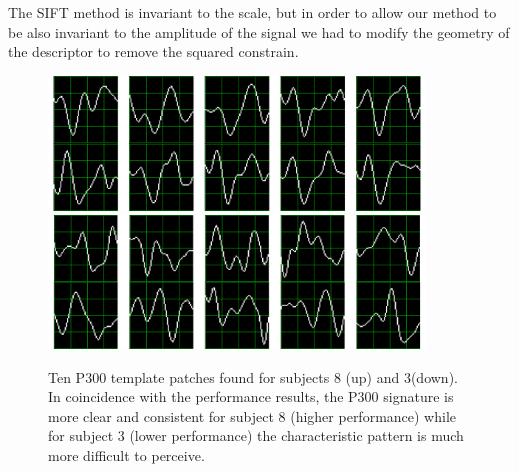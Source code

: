 \documentclass[entropy,article,submit,moreauthors,pdftex,10pt,a4paper]{mdpi}
\begin{document}
The SIFT method is invariant to the scale, but in order to allow our method to be also invariant to the amplitude of the signal we had to modify the geometry of the descriptor to remove the squared constrain.

\begin{figure}[H]
\centering
\includegraphics[width=10cm]{subject8.png}
\includegraphics[width=10cm]{subject3.png}
\caption{Ten P300 template patches found for subjects 8 (up) and 3(down).  In coincidence with the performance results, the P300 signature is more clear and consistent for subject 8 (higher performance) while for subject 3 (lower performance) the characteristic pattern is much more difficult to perceive.}
\label{fig:p300templates}
\end{figure}
\end{document}
